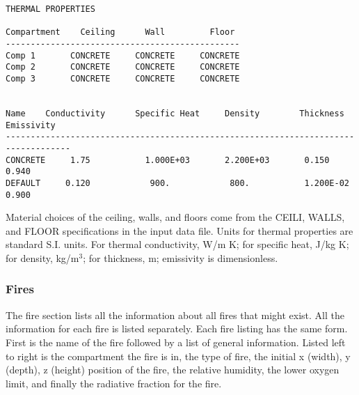 \begin{lstlisting}[basicstyle=\tiny]
THERMAL PROPERTIES

Compartment    Ceiling      Wall         Floor
-----------------------------------------------
Comp 1       CONCRETE     CONCRETE     CONCRETE
Comp 2       CONCRETE     CONCRETE     CONCRETE
Comp 3       CONCRETE     CONCRETE     CONCRETE


Name    Conductivity      Specific Heat     Density        Thickness     Emissivity
-----------------------------------------------------------------------------------
CONCRETE     1.75           1.000E+03       2.200E+03       0.150           0.940
DEFAULT     0.120            900.            800.           1.200E-02       0.900
\end{lstlisting}
Material choices of the ceiling, walls, and floors come from the CEILI, WALLS, and FLOOR specifications in the input data file. Units for thermal properties are standard S.I. units.  For thermal conductivity, W/m K; for specific heat, J/kg K; for density, kg/m$^3$; for thickness, m; emissivity is dimensionless.


\subsubsection{Fires}

The fire section lists all the information about all fires that might exist.  All the information for each fire is listed separately.   Each fire listing has the same form.  First is the name of the fire followed by a list of general information.  Listed left to right is the compartment the fire is in, the type of fire, the initial x (width), y (depth), z (height) position of the fire, the relative humidity, the lower oxygen limit, and finally the radiative fraction for the fire.


